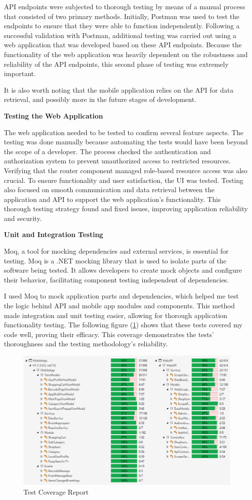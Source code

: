 API endpoints were subjected to thorough testing by means of a manual process that consisted of two primary methods. Initially, Postman was used to test the endpoints to ensure that they were able to function independently. Following a successful validation with Postman, additional testing was carried out using a web application that was developed based on these API endpoints. Because the functionality of the web application was heavily dependent on the robustness and reliability of the API endpoints, this second phase of testing was extremely important. 

It is also worth noting that the mobile application relies on the API for data retrieval, and possibly more in the future stages of development.

\noindent\textbf{Testing the Web Application}

The web application needed to be tested to confirm several feature aspects. The testing was done manually because automating the tests would have been beyond the scope of a developer. The process checked the authentication and authorization system to prevent unauthorized access to restricted resources. Verifying that the router component managed role-based resource access was also crucial. To ensure functionality and user satisfaction, the UI was tested. Testing also focused on smooth communication and data retrieval between the application and API to support the web application's functionality. This thorough testing strategy found and fixed issues, improving application reliability and security.

\noindent\textbf{Unit and Integration Testing}

Moq, a tool for mocking dependencies and external services, is essential for testing. Moq is a .NET mocking library that is used to isolate parts of the software being tested. It allows developers to create mock objects and configure their behavior, facilitating component testing independent of dependencies. \cite{moq}

I used Moq to mock application parts and dependencies, which helped me test the logic behind API and mobile app modules and components. This method made integration and unit testing easier, allowing for thorough application functionality testing. The following figure (\ref{fig:testcoverage}) shows that these tests covered my code well, proving their efficacy. This coverage demonstrates the tests' thoroughness and the testing methodology's reliability.

\begin{figure}[H]
	\centering
	\includegraphics[width=0.8\linewidth]{img/testcoverage.png}
	\caption{Test Coverage Report}
	\label{fig:testcoverage}
\end{figure}